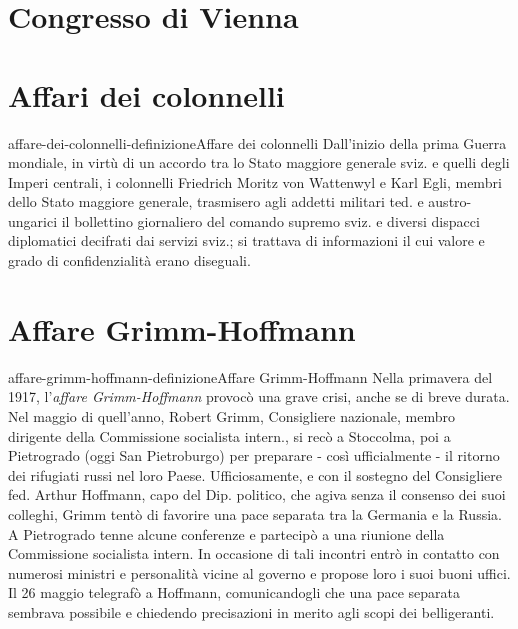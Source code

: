 \documentclass[preview]{standalone}
\begin{document}
\section{Congresso di Vienna}


\section{Affari dei colonnelli}

\begin{snippetdefinition}{affare-dei-colonnelli-definizione}{Affare dei colonnelli}
    Dall'inizio della prima Guerra mondiale,
    in virtù di un accordo tra lo Stato maggiore generale sviz.
    e quelli degli Imperi centrali, i colonnelli Friedrich Moritz von Wattenwyl e Karl Egli,
    membri dello Stato maggiore generale, trasmisero agli addetti militari ted. e austro-ungarici
    il bollettino giornaliero del comando supremo sviz. e diversi dispacci diplomatici decifrati
    dai servizi sviz.; si trattava di informazioni il cui valore e grado di confidenzialità
    erano diseguali.
\end{snippetdefinition}

\section{Affare Grimm-Hoffmann}

\begin{snippetdefinition}{affare-grimm-hoffmann-definizione}{Affare Grimm-Hoffmann}
    Nella primavera del 1917,
    l'\textit{affare Grimm-Hoffmann} provocò una grave crisi,
    anche se di breve durata. Nel maggio di quell'anno, 
    Robert Grimm, Consigliere nazionale, membro dirigente della 
    Commissione socialista intern., si recò a Stoccolma, poi 
    a Pietrogrado (oggi San Pietroburgo) per preparare - così ufficialmente - 
    il ritorno dei rifugiati russi nel loro Paese. 
    Ufficiosamente, e con il sostegno del Consigliere fed. Arthur Hoffmann, 
    capo del Dip. politico, che agiva senza il consenso dei suoi colleghi, 
    Grimm tentò di favorire una pace separata tra la Germania e la Russia. 
    A Pietrogrado tenne alcune conferenze e partecipò a una riunione della Commissione
    socialista intern. In occasione di tali incontri entrò in contatto con numerosi
    ministri e personalità vicine al governo e propose loro i suoi buoni uffici.
    Il 26 maggio telegrafò a Hoffmann, comunicandogli che una pace separata
    sembrava possibile e chiedendo precisazioni in merito agli scopi dei belligeranti.
\end{snippetdefinition}
\end{document}
